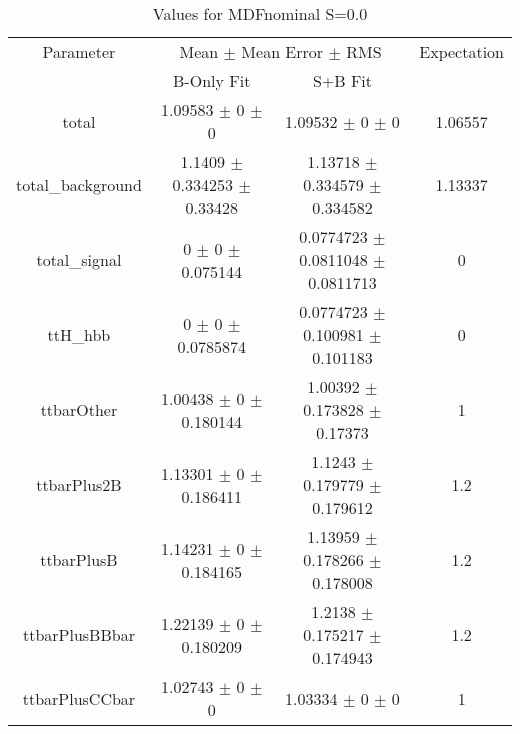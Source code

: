 \begin{table}
\centering
\caption{Values for MDFnominal S=0.0}
\begin{tabular}{cccc}
\toprule
Parameter & \multicolumn{2}{c}{Mean $\pm$ Mean Error $\pm$ RMS} & Expectation\\
 & B-Only Fit & S+B Fit & \\
\midrule
total & \num{1.09583} $\pm$ \num{0} $\pm$ \num{0} & \num{1.09532} $\pm$ \num{0} $\pm$ \num{0} & \num{1.06557}\\
total\_background & \num{1.1409} $\pm$ \num{0.334253} $\pm$ \num{0.33428} & \num{1.13718} $\pm$ \num{0.334579} $\pm$ \num{0.334582} & \num{1.13337}\\
total\_signal & \num{0} $\pm$ \num{0} $\pm$ \num{0.075144} & \num{0.0774723} $\pm$ \num{0.0811048} $\pm$ \num{0.0811713} & \num{0}\\
ttH\_hbb & \num{0} $\pm$ \num{0} $\pm$ \num{0.0785874} & \num{0.0774723} $\pm$ \num{0.100981} $\pm$ \num{0.101183} & \num{0}\\
ttbarOther & \num{1.00438} $\pm$ \num{0} $\pm$ \num{0.180144} & \num{1.00392} $\pm$ \num{0.173828} $\pm$ \num{0.17373} & \num{1}\\
ttbarPlus2B & \num{1.13301} $\pm$ \num{0} $\pm$ \num{0.186411} & \num{1.1243} $\pm$ \num{0.179779} $\pm$ \num{0.179612} & \num{1.2}\\
ttbarPlusB & \num{1.14231} $\pm$ \num{0} $\pm$ \num{0.184165} & \num{1.13959} $\pm$ \num{0.178266} $\pm$ \num{0.178008} & \num{1.2}\\
ttbarPlusBBbar & \num{1.22139} $\pm$ \num{0} $\pm$ \num{0.180209} & \num{1.2138} $\pm$ \num{0.175217} $\pm$ \num{0.174943} & \num{1.2}\\
ttbarPlusCCbar & \num{1.02743} $\pm$ \num{0} $\pm$ \num{0} & \num{1.03334} $\pm$ \num{0} $\pm$ \num{0} & \num{1}\\
\bottomrule
\end{tabular}
\end{table}